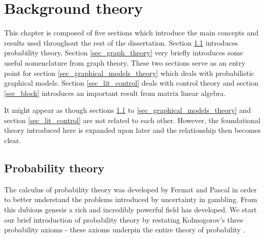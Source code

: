 \chapter{Background theory}
\label{sec_back_theory}
This chapter is composed of five sections which introduce the main concepts and results used throughout the rest of the dissertation. Section \ref{sec_prob_theory} introduces probability theory. Section \ref{sec_graph_theory} very briefly introduces some useful nomenclature from graph theory. These two sections serve as an entry point for section \ref{sec_graphical_models_theory} which deals with probabilistic graphical models. Section \ref{sec_lit_control} deals with control theory and section \ref{sec_block} introduces an important result from matrix linear algebra.

It might appear as though sections \ref{sec_prob_theory} to \ref{sec_graphical_models_theory} and section \ref{sec_lit_control} are not related to each other. However, the foundational theory introduced here is expanded upon later and the relationship then becomes clear.

\section{Probability theory}
\label{sec_prob_theory}
The calculus of probability theory was developed by Fermat and Pascal in order to better understand the problems introduced by uncertainty in gambling. From this dubious genesis a rich and incredibly powerful field has developed. We start our brief introduction of probability theory by restating Kolmogorov's three probability axioms - these axioms underpin the entire theory of probability \cite{koller}.

